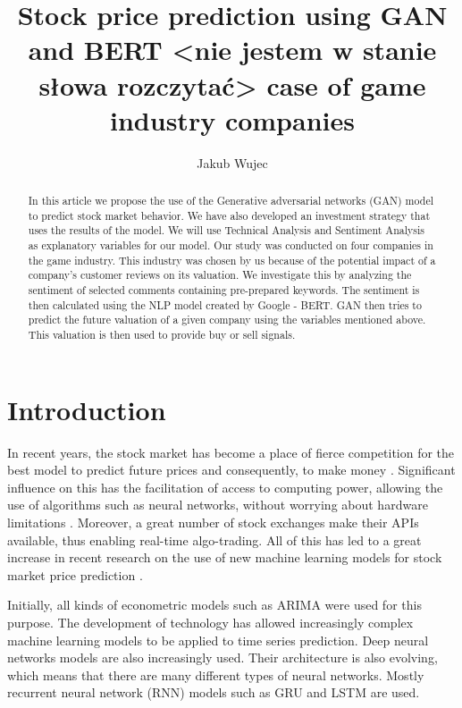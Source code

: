 \documentclass[11pt]{article} %
\title{Stock price prediction using GAN and BERT <nie jestem w stanie słowa rozczytać> case of game industry companies}
\author{Jakub Wujec}
\begin{document}
\maketitle


\begin{abstract} In this article we propose the use of the Generative adversarial networks (GAN) model to predict stock market behavior. We have also developed an investment strategy that uses the results of the model. We will use Technical Analysis and Sentiment Analysis as explanatory variables for our model. Our study was conducted on four companies in the game industry. This industry was chosen by us because of the potential impact of a company's customer reviews on its valuation. We investigate this by analyzing the sentiment of selected comments containing pre-prepared keywords. The sentiment is then calculated using the NLP model created by Google - BERT. GAN then tries to predict the future valuation of a given company using the variables mentioned above. This valuation is then used to provide buy or sell signals.  
\end{abstract}

\section{Introduction}
In recent years, the stock market has become a place of fierce competition for the best model to predict future prices and consequently, to make money \cite{ml-in-stock}. 
Significant influence on this has the facilitation of access to computing power, allowing the use of algorithms such as neural networks, without worrying about hardware limitations \cite{ml-compute}. Moreover, a great number of stock exchanges make their APIs available, thus enabling real-time algo-trading. All of this has led to a great increase in recent research on the use of new machine learning models for stock market price prediction \cite{ml-studies}.  

Initially, all kinds of econometric models such as ARIMA were used for this purpose. The development of technology has allowed increasingly complex machine learning models to be applied to time series prediction. Deep neural networks models are also increasingly used. Their architecture is also evolving, which means that there are many different types of neural networks. Mostly recurrent neural network (RNN) models such as GRU and LSTM are used. 
\end{document}
